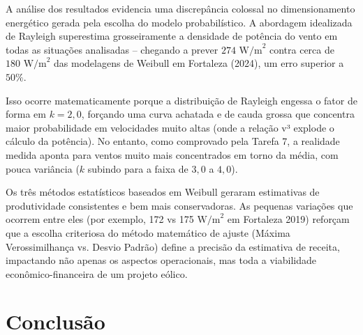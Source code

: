 \documentclass[11pt,a4paper]{article}
\begin{document}
A análise dos resultados evidencia uma discrepância colossal no dimensionamento energético gerada pela escolha do modelo probabilístico. A abordagem idealizada de Rayleigh superestima grosseiramente a densidade de potência do vento em todas as situações analisadas -- chegando a prever $274 \text{ W/m}^2$ contra cerca de $180 \text{ W/m}^2$ das modelagens de Weibull em Fortaleza (2024), um erro superior a $50\%$.

Isso ocorre matematicamente porque a distribuição de Rayleigh engessa o fator de forma em $k=2{,}0$, forçando uma curva achatada e de cauda grossa que concentra maior probabilidade em velocidades muito altas (onde a relação v³ explode o cálculo da potência). No entanto, como comprovado pela Tarefa 7, a realidade medida aponta para ventos muito mais concentrados em torno da média, com pouca variância ($k$ subindo para a faixa de $3{,}0$ a $4{,}0$).

Os três métodos estatísticos baseados em Weibull geraram estimativas de produtividade consistentes e bem mais conservadoras. As pequenas variações que ocorrem entre eles (por exemplo, 172 vs 175 $\text{W/m}^2$ em Fortaleza 2019) reforçam que a escolha criteriosa do método matemático de ajuste (Máxima Verossimilhança vs. Desvio Padrão) define a precisão da estimativa de receita, impactando não apenas os aspectos operacionais, mas toda a viabilidade econômico-financeira de um projeto eólico.


\section{Conclusão}
\end{document}
